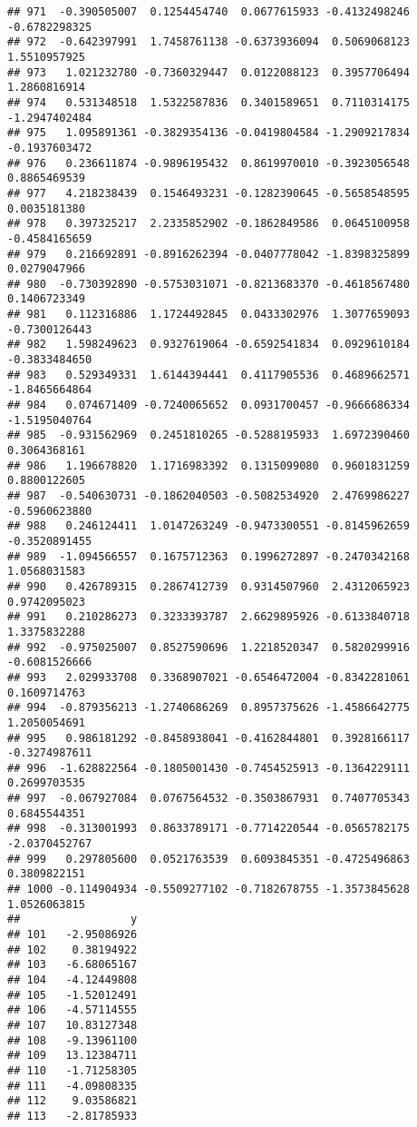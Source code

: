 \documentclass[
]{article}
\begin{document}
\begin{verbatim}
## 971  -0.390505007  0.1254454740  0.0677615933 -0.4132498246 -0.6782298325
## 972  -0.642397991  1.7458761138 -0.6373936094  0.5069068123  1.5510957925
## 973   1.021232780 -0.7360329447  0.0122088123  0.3957706494  1.2860816914
## 974   0.531348518  1.5322587836  0.3401589651  0.7110314175 -1.2947402484
## 975   1.095891361 -0.3829354136 -0.0419804584 -1.2909217834 -0.1937603472
## 976   0.236611874 -0.9896195432  0.8619970010 -0.3923056548  0.8865469539
## 977   4.218238439  0.1546493231 -0.1282390645 -0.5658548595  0.0035181380
## 978   0.397325217  2.2335852902 -0.1862849586  0.0645100958 -0.4584165659
## 979   0.216692891 -0.8916262394 -0.0407778042 -1.8398325899  0.0279047966
## 980  -0.730392890 -0.5753031071 -0.8213683370 -0.4618567480  0.1406723349
## 981   0.112316886  1.1724492845  0.0433302976  1.3077659093 -0.7300126443
## 982   1.598249623  0.9327619064 -0.6592541834  0.0929610184 -0.3833484650
## 983   0.529349331  1.6144394441  0.4117905536  0.4689662571 -1.8465664864
## 984   0.074671409 -0.7240065652  0.0931700457 -0.9666686334 -1.5195040764
## 985  -0.931562969  0.2451810265 -0.5288195933  1.6972390460  0.3064368161
## 986   1.196678820  1.1716983392  0.1315099080  0.9601831259  0.8800122605
## 987  -0.540630731 -0.1862040503 -0.5082534920  2.4769986227 -0.5960623880
## 988   0.246124411  1.0147263249 -0.9473300551 -0.8145962659 -0.3520891455
## 989  -1.094566557  0.1675712363  0.1996272897 -0.2470342168  1.0568031583
## 990   0.426789315  0.2867412739  0.9314507960  2.4312065923  0.9742095023
## 991   0.210286273  0.3233393787  2.6629895926 -0.6133840718  1.3375832288
## 992  -0.975025007  0.8527590696  1.2218520347  0.5820299916 -0.6081526666
## 993   2.029933708  0.3368907021 -0.6546472004 -0.8342281061  0.1609714763
## 994  -0.879356213 -1.2740686269  0.8957375626 -1.4586642775  1.2050054691
## 995   0.986181292 -0.8458938041 -0.4162844801  0.3928166117 -0.3274987611
## 996  -1.628822564 -0.1805001430 -0.7454525913 -0.1364229111  0.2699703535
## 997  -0.067927084  0.0767564532 -0.3503867931  0.7407705343  0.6845544351
## 998  -0.313001993  0.8633789171 -0.7714220544 -0.0565782175 -2.0370452767
## 999   0.297805600  0.0521763539  0.6093845351 -0.4725496863  0.3809822151
## 1000 -0.114904934 -0.5509277102 -0.7182678755 -1.3573845628  1.0526063815
##                 y
## 101   -2.95086926
## 102    0.38194922
## 103   -6.68065167
## 104   -4.12449808
## 105   -1.52012491
## 106   -4.57114555
## 107   10.83127348
## 108   -9.13961100
## 109   13.12384711
## 110   -1.71258305
## 111   -4.09808335
## 112    9.03586821
## 113   -2.81785933

\end{verbatim}
\end{document}
